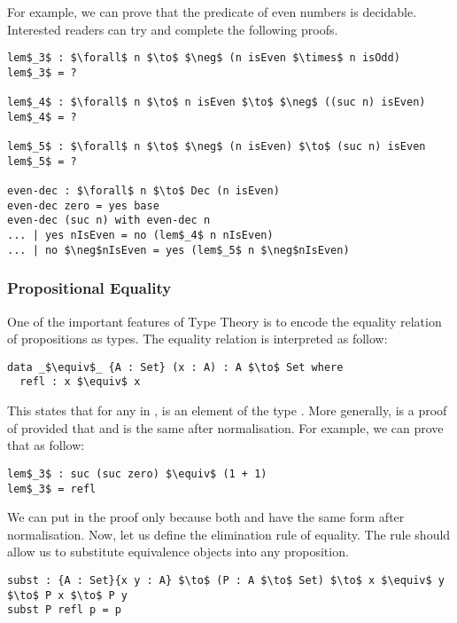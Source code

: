 \par For example, we can prove that the predicate of even numbers is
decidable. Interested readers can try and complete the following proofs. 
\begin{lstlisting}[mathescape=true,xleftmargin=.3\textwidth]
lem$_3$ : $\forall$ n $\to$ $\neg$ (n isEven $\times$ n isOdd)
lem$_3$ = ?

lem$_4$ : $\forall$ n $\to$ n isEven $\to$ $\neg$ ((suc n) isEven)
lem$_4$ = ?

lem$_5$ : $\forall$ n $\to$ $\neg$ (n isEven) $\to$ (suc n) isEven
lem$_5$ = ?

even-dec : $\forall$ n $\to$ Dec (n isEven)
even-dec zero = yes base
even-dec (suc n) with even-dec n
... | yes nIsEven = no (lem$_4$ n nIsEven)
... | no $\neg$nIsEven = yes (lem$_5$ n $\neg$nIsEven)
\end{lstlisting} 


\subsubsection{Propositional Equality} 
\par One of the important features of Type Theory is
to encode the equality relation of propositions as types. The
equality relation is interpreted as follow:
\begin{lstlisting}[mathescape=true,xleftmargin=.3\textwidth]
data _$\equiv$_ {A : Set} (x : A) : A $\to$ Set where
  refl : x $\equiv$ x
\end{lstlisting}

\par This states that for any  in ,  is an
element of the type . More generally,  is a
proof of  provided that  and  is the same
after normalisation. For example, we can prove that  as follow:
\begin{lstlisting}[mathescape=true,xleftmargin=.3\textwidth]
lem$_3$ : suc (suc zero) $\equiv$ (1 + 1)
lem$_3$ = refl
\end{lstlisting}

\par We can put  in the proof only because both
 and  have the same form after
normalisation. Now, let us define the elimination rule of
equality. The rule should allow us to substitute equivalence objects
into any proposition. 
\begin{lstlisting}[mathescape=true,xleftmargin=.3\textwidth]
subst : {A : Set}{x y : A} $\to$ (P : A $\to$ Set) $\to$ x $\equiv$ y $\to$ P x $\to$ P y
subst P refl p = p 
\end{lstlisting}

